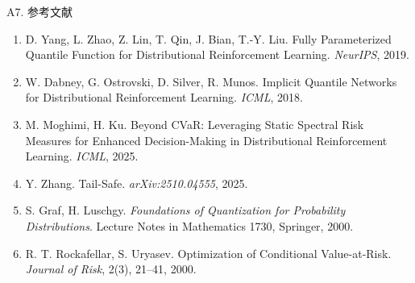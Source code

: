 \documentclass[aspectratio=169, 10pt]{beamer}
\begin{document}
\begin{frame}{A7. 参考文献}
  \footnotesize
  \begin{enumerate}
    \item D. Yang, L. Zhao, Z. Lin, T. Qin, J. Bian, T.-Y. Liu.
          Fully Parameterized Quantile Function for Distributional Reinforcement Learning. \textit{NeurIPS}, 2019.
    \item W. Dabney, G. Ostrovski, D. Silver, R. Munos.
          Implicit Quantile Networks for Distributional Reinforcement Learning. \textit{ICML}, 2018.
    \item M. Moghimi, H. Ku. Beyond CVaR: Leveraging Static Spectral Risk Measures for Enhanced Decision-Making in Distributional Reinforcement Learning. \textit{ICML}, 2025.
    \item Y. Zhang. Tail-Safe. \textit{arXiv:2510.04555}, 2025.
    \item S. Graf, H. Luschgy. \textit{Foundations of Quantization for Probability Distributions}. Lecture Notes in Mathematics 1730, Springer, 2000.
    \item R. T. Rockafellar, S. Uryasev. Optimization of Conditional Value-at-Risk. \textit{Journal of Risk}, 2(3), 21--41, 2000.
  \end{enumerate}
\end{frame}
\end{document}
